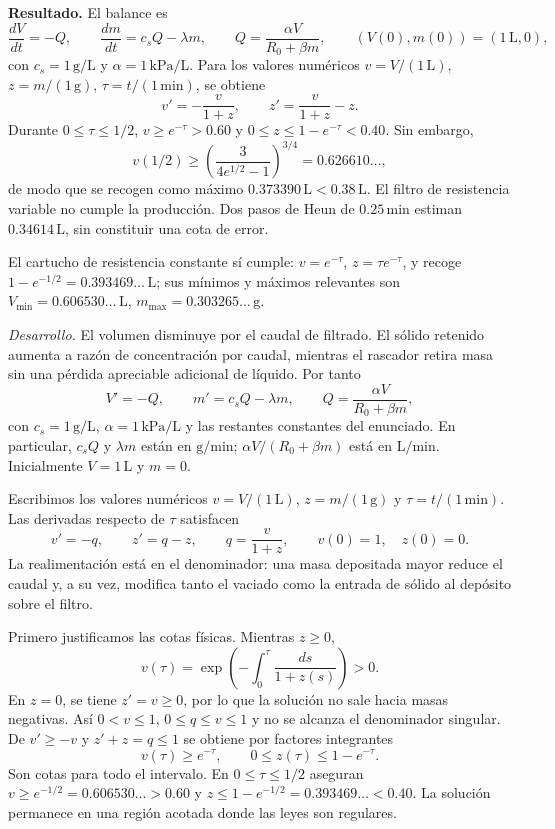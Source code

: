 \noindent\textbf{Resultado.} El balance es
\[
\frac{dV}{dt}=-Q,\qquad \frac{dm}{dt}=c_sQ-\lambda m,
\qquad Q=\frac{\alpha V}{R_0+\beta m},
\qquad (V(0),m(0))=(1\,\mathrm L,0),
\]
con \(c_s=1\,\mathrm{g/L}\) y \(\alpha=1\,\mathrm{kPa/L}\). Para los valores numéricos \(v=V/(1\,\mathrm L)\), \(z=m/(1\,\mathrm g)\), \(\tau=t/(1\,\mathrm{min})\), se obtiene
\[
v'=-\frac{v}{1+z},\qquad z'=\frac{v}{1+z}-z.
\]
Durante \(0\le\tau\le1/2\), \(v\ge e^{-\tau}>0.60\) y \(0\le z\le1-e^{-\tau}<0.40\). Sin embargo,
\[
v(1/2)\ge\left(\frac3{4e^{1/2}-1}\right)^{3/4}
=0.626610\ldots,
\]
de modo que se recogen como máximo \(0.373390\,\mathrm L<0.38\,\mathrm L\). El filtro de resistencia variable no cumple la producción. Dos pasos de Heun de \(0.25\,\mathrm{min}\) estiman \(0.34614\,\mathrm L\), sin constituir una cota de error.

El cartucho de resistencia constante sí cumple: \(v=e^{-\tau}\), \(z=\tau e^{-\tau}\), y recoge \(1-e^{-1/2}=0.393469\ldots\,\mathrm L\); sus mínimos y máximos relevantes son \(V_{\min}=0.606530\ldots\,\mathrm L\), \(m_{\max}=0.303265\ldots\,\mathrm g\).

\noindent\textit{Desarrollo.} El volumen disminuye por el caudal de filtrado. El sólido retenido aumenta a razón de concentración por caudal, mientras el rascador retira masa sin una pérdida apreciable adicional de líquido. Por tanto
\[
V'=-Q,\qquad m'=c_sQ-\lambda m,\qquad
Q=\frac{\alpha V}{R_0+\beta m},
\]
con \(c_s=1\,\mathrm{g/L}\), \(\alpha=1\,\mathrm{kPa/L}\) y las restantes constantes del enunciado. En particular, \(c_sQ\) y \(\lambda m\) están en \(\mathrm{g/min}\); \(\alpha V/(R_0+\beta m)\) está en \(\mathrm{L/min}\). Inicialmente \(V=1\,\mathrm L\) y \(m=0\).

Escribimos los valores numéricos \(v=V/(1\,\mathrm L)\), \(z=m/(1\,\mathrm g)\) y \(\tau=t/(1\,\mathrm{min})\). Las derivadas respecto de \(\tau\) satisfacen
\[
v'=-q,\qquad z'=q-z,\qquad q=\frac{v}{1+z},
\qquad v(0)=1,\quad z(0)=0.
\]
La realimentación está en el denominador: una masa depositada mayor reduce el caudal y, a su vez, modifica tanto el vaciado como la entrada de sólido al depósito sobre el filtro.

Primero justificamos las cotas físicas. Mientras \(z\ge0\),
\[
v(\tau)=\exp\left(-\int_0^\tau\frac{ds}{1+z(s)}\right)>0.
\]
En \(z=0\), se tiene \(z'=v\ge0\), por lo que la solución no sale hacia masas negativas. Así \(0<v\le1\), \(0\le q\le v\le1\) y no se alcanza el denominador singular. De \(v'\ge-v\) y \(z'+z=q\le1\) se obtiene por factores integrantes
\[
v(\tau)\ge e^{-\tau},\qquad 0\le z(\tau)\le1-e^{-\tau}.
\]
Son cotas para todo el intervalo. En \(0\le\tau\le1/2\) aseguran \(v\ge e^{-1/2}=0.606530\ldots>0.60\) y \(z\le1-e^{-1/2}=0.393469\ldots<0.40\). La solución permanece en una región acotada donde las leyes son regulares.

